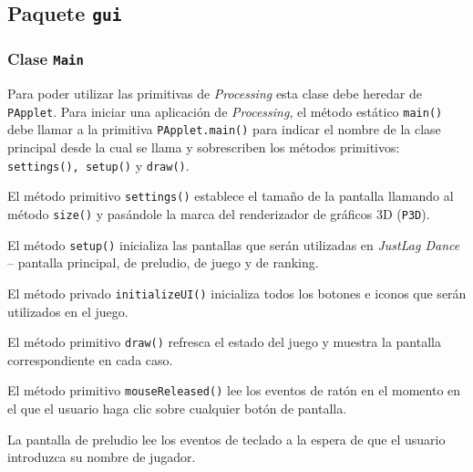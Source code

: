 \documentclass[10pt,a4paper]{report}
\begin{document}
	\subsection{Paquete \texttt{gui}}
	\subsubsection{Clase \texttt{Main}}\label{class:main}
	Para poder utilizar las primitivas de \textit{Processing} esta clase debe heredar de \texttt{PApplet}. Para iniciar una aplicación de \textit{Processing}, el método estático \texttt{main()} debe llamar a la primitiva \texttt{PApplet.main()} para indicar el nombre de la clase principal desde la cual se llama y sobrescriben los métodos primitivos: \texttt{settings(), setup()} y \texttt{draw()}.
	
	
	
	El método primitivo \texttt{settings()} establece el tamaño de la pantalla llamando al método \texttt{size()} y pasándole la marca del renderizador de gráficos 3D (\texttt{P3D}).
	
	
	
	El método \texttt{setup()} inicializa las pantallas que serán utilizadas en \textit{JustLag Dance} -- pantalla principal, de preludio, de juego y de ranking.
	
	
	
	El método privado \texttt{initializeUI()} inicializa todos los botones e iconos que serán utilizados en el juego.
	
	
	
	El método primitivo \texttt{draw()} refresca el estado del juego y muestra la pantalla correspondiente en cada caso.
	
		
	
	El método primitivo \texttt{mouseReleased()} lee los eventos de ratón en el momento en el que el usuario haga clic sobre cualquier botón de pantalla.
	 
	 	
	 
	 La pantalla de preludio lee los eventos de teclado a la espera de que el usuario introduzca su nombre de jugador.
	 
\end{document}
